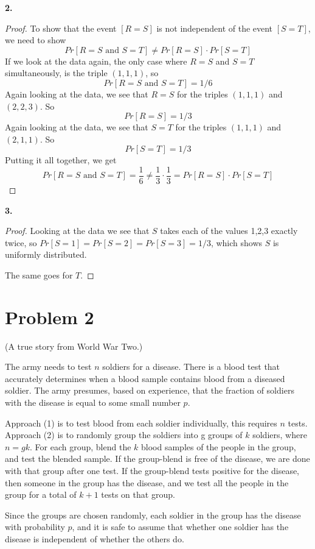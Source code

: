 \documentclass[14pt]{extarticle}
\begin{document}
{\bf 2.}
\begin{proof}
To show that the event $[R = S]$ is not independent of the event $[S = T]$, we need to show
$$
Pr[R = S \text{ and } S = T] \neq Pr[R = S] \cdot Pr[S = T]
$$
If we look at the data again, the only case where $R = S$ and $S = T$ simultaneously, is the triple $(1,1,1)$, so
$$
Pr[R = S \text{ and } S = T] = 1/6
$$
Again looking at the data, we see that $R = S$ for the triples $(1,1,1)$ and $(2,2,3)$. So
$$
Pr[R = S] = 1/3
$$
Again looking at the data, we see that $S = T$ for the triples $(1,1,1)$ and $(2,1,1)$. So
$$
Pr[S = T] = 1/3
$$
Putting it all together, we get
$$
Pr[R = S \text{ and } S = T] = \frac{1}{6} \neq \frac{1}{3} \cdot \frac{1}{3} = Pr[R = S] \cdot Pr[S = T]
$$
\end{proof}
{\bf 3.}
\begin{proof}
Looking at the data we see that $S$ takes each of the values 1,2,3 exactly twice, so $Pr[S=1] = Pr[S=2] = Pr[S=3] = 1/3$, which shows $S$ is uniformly distributed.

The same goes for $T$.
\end{proof}

\section{Problem 2}
(A true story from World War Two.)

The army needs to test $n$ soldiers for a disease. There is a blood test that accurately determines when a blood sample contains blood from a diseased soldier. The army presumes, based on experience, that the
fraction of soldiers with the disease is equal to some small number $p$.

Approach (1) is to test blood from each soldier individually, this requires $n$ tests. Approach (2) is to randomly group the soldiers into g groups of $k$ soldiers, where $n = gk$. For each group, blend the $k$ blood samples of the people in the group, and test the blended sample. If the group-blend is free of the disease, we are done with that group after one test. If the group-blend tests positive for the disease, then someone in the group has the disease, and we test all the people in the group for a total of $k + 1$ tests on that group.

Since the groups are chosen randomly, each soldier in the group has the disease with probability $p$, and it is safe to assume that whether one soldier has the disease is independent of whether the others do.
\end{document}
